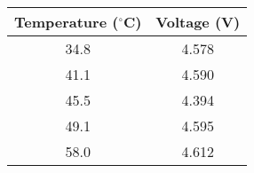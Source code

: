   \begin{tabular}{|c|c|} 
        \hline
        \textbf{Temperature ($^{\circ}$C)} & \textbf{Voltage (V)} \\
        \hline
        34.8 & 4.578 \\
        \hline
        41.1 & 4.590 \\
        \hline
        45.5 & 4.394 \\
        \hline
        49.1 & 4.595 \\
        \hline
        58.0 & 4.612 \\
        \hline
    \end{tabular}
